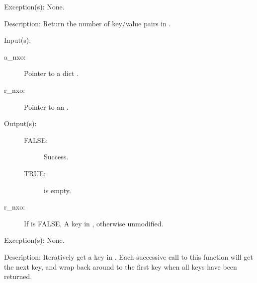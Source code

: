 \begin{capi}
\begin{capilist}
\begin{description}
		\end{description}
	\item[Exception(s): ] None.
	\item[Description: ]
		Return the number of key/value pairs in .
	\end{capilist}
\label{nxo_dict_iterate}
	\begin{capilist}
	\item[Input(s): ]
		\begin{description}\item[]
		\item[a\_nxo: ]
			Pointer to a dict .
		\item[r\_nxo: ]
			Pointer to an .
		\end{description}
	\item[Output(s): ]
		\begin{description}\item[]
			\begin{description}\item[]
			\item[FALSE: ]
				Success.
			\item[TRUE: ]
				 is empty.
			\end{description}
		\item[r\_nxo: ]
			If  is FALSE, A key in ,
			otherwise unmodified.
		\end{description}
	\item[Exception(s): ] None.
	\item[Description: ]
		Iteratively get a key in .  Each successive call to
		this function will get the next key, and wrap back around to the
		first key when all keys have been returned.
	\end{capilist}
\end{capi}
